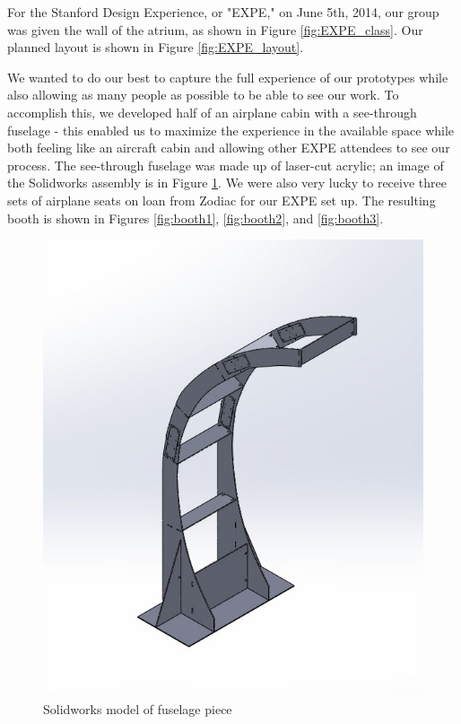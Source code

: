 For the Stanford Design Experience, or "EXPE," on June 5th, 2014, our group was given the wall of the atrium, as shown in Figure \ref{fig:EXPE_class}. Our planned layout is shown in Figure \ref{fig:EXPE_layout}.

We wanted to do our best to capture the full experience of our prototypes while also allowing as many people as possible to be able to see our work. To accomplish this, we developed half of an airplane cabin with a see-through fuselage - this enabled us to maximize the experience in the available space while both feeling like an aircraft cabin and allowing other EXPE attendees to see our process. The see-through fuselage was made up of laser-cut acrylic; an image of the Solidworks assembly is in Figure \ref{fig:strut}. We were also very lucky to receive three sets of airplane seats on loan from Zodiac for our EXPE set up. The resulting booth is shown in Figures \ref{fig:booth1}, \ref{fig:booth2}, and \ref{fig:booth3}.

\begin{figure}
  \centering
     \includegraphics[scale=0.35]{images/strut}
   \caption{Solidworks model of fuselage piece}
  \label{fig:strut}
\end{figure}

